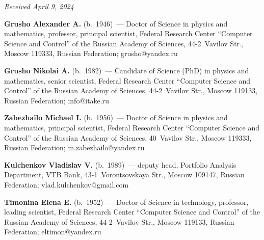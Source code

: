 \vspace*{-6pt}

\hfill{\small\textit{Received April 9, 2024}} 


\vspace*{-12pt}


\Contr

\vspace*{-3pt}


\noindent
\textbf{Grusho Alexander A.} (b.\ 1946)~--- Doctor of Science in physics and mathematics, professor, 
principal scientist, Federal Research Center ``Computer Science and Control'' of the Russian Academy 
of Sciences, 44-2~Vavilov Str., Moscow 119333, Russian Federation; \mbox{grusho@yandex.ru}


\vspace*{3pt}

\noindent
\textbf{Grusho Nikolai A.} (b.\ 1982)~--- Candidate of Science (PhD) in physics and mathematics, 
senior scientist, Federal Research Center ``Computer Science and Control'' of the Russian Academy of 
Sciences, 44-2~Vavilov Str., Moscow 119133, Russian Federation; \mbox{info@itake.ru}



\vspace*{3pt}

\noindent
\textbf{Zabezhailo Michael I.} (b.\ 1956)~--- Doctor of Science in physics and mathematics, principal 
scientist, Federal Research Center ``Computer Science and Control'' of the Russian Academy of 
Sciences, 40~Vavilov Str., Moscow 119333, Russian Federation; \mbox{m.zabezhailo@yandex.ru}



\vspace*{3pt}

\noindent
\textbf{Kulchenkov Vladislav V.} (b.\ 1989)~--- deputy head, Portfolio Analysis Department, VTB 
Bank, 43-1~Vorontsovskaya Str., Moscow 109147, Russian Federation; 
\mbox{vlad.kulchenkov@gmail.com}



\vspace*{3pt}

\noindent
\textbf{Timonina Elena E.} (b.\ 1952)~--- Doctor of Science in technology, professor, leading scientist, 
Federal Research Center ``Computer Science and Control'' of the Russian Academy of Sciences,  
44-2~Vavilov Str., Moscow 119133, Russian Federation; \mbox{eltimon@yandex.ru}




\label{end\stat}

\renewcommand{\bibname}{\protect\rm Литература} 